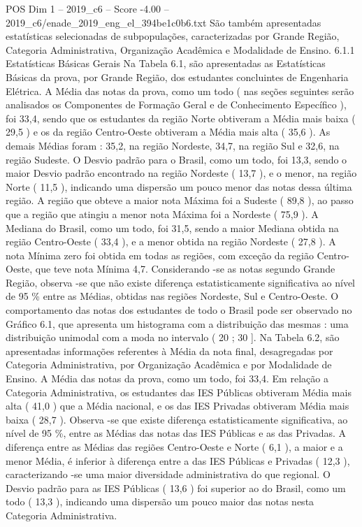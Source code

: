 \begin{textsample}{POS Dim 1 – 2019\_c6 – Score -4.00 – 2019\_c6/enade\_2019\_eng\_el\_394be1c0b6.txt}
São também apresentadas estatísticas selecionadas de subpopulações, caracterizadas por Grande Região, Categoria Administrativa, Organização Acadêmica e Modalidade de Ensino. 6.1.1 Estatísticas Básicas Gerais Na Tabela 6.1, são apresentadas as Estatísticas Básicas da prova, por Grande Região, dos estudantes concluintes de Engenharia Elétrica.
A Média das notas da prova, como um todo ( nas seções seguintes serão analisados os Componentes de Formação Geral e de Conhecimento Específico ), foi 33,4, sendo que os estudantes da região Norte obtiveram a Média mais baixa ( 29,5 ) e os da região Centro-Oeste obtiveram a Média mais alta ( 35,6 ).
As demais Médias foram : 35,2, na região Nordeste, 34,7, na região Sul e 32,6, na região Sudeste.
O Desvio padrão para o Brasil, como um todo, foi 13,3, sendo o maior Desvio padrão encontrado na região Nordeste ( 13,7 ), e o menor, na região Norte ( 11,5 ), indicando uma dispersão um pouco menor das notas dessa última região.
A região que obteve a maior nota Máxima foi a Sudeste ( 89,8 ), ao passo que a região que atingiu a menor nota Máxima foi a Nordeste ( 75,9 ).
A Mediana do Brasil, como um todo, foi 31,5, sendo a maior Mediana obtida na região Centro-Oeste ( 33,4 ), e a menor obtida na região Nordeste ( 27,8 ).
A nota Mínima zero foi obtida em todas as regiões, com exceção da região Centro-Oeste, que teve nota Mínima 4,7.
Considerando -se as notas segundo Grande Região, observa -se que não existe diferença estatisticamente significativa ao nível de 95 \% entre as Médias, obtidas nas regiões Nordeste, Sul e Centro-Oeste.
O comportamento das notas dos estudantes de todo o Brasil pode ser observado no Gráfico 6.1, que apresenta um histograma com a distribuição das mesmas : uma distribuição unimodal com a moda no intervalo ( 20 ; 30 ].
Na Tabela 6.2, são apresentadas informações referentes à Média da nota final, desagregadas por Categoria Administrativa, por Organização Acadêmica e por Modalidade de Ensino.
A Média das notas da prova, como um todo, foi 33,4.
Em relação a Categoria Administrativa, os estudantes das IES Públicas obtiveram Média mais alta ( 41,0 ) que a Média nacional, e os das IES Privadas obtiveram Média mais baixa ( 28,7 ).
Observa -se que existe diferença estatisticamente significativa, ao nível de 95 \%, entre as Médias das notas das IES Públicas e as das Privadas.
A diferença entre as Médias das regiões Centro-Oeste e Norte ( 6,1 ), a maior e a menor Média, é inferior à diferença entre a das IES Públicas e Privadas ( 12,3 ), caracterizando -se uma maior diversidade administrativa do que regional.
O Desvio padrão para as IES Públicas ( 13,6 ) foi superior ao do Brasil, como um todo ( 13,3 ), indicando uma dispersão um pouco maior das notas nesta Categoria Administrativa.

\end{textsample}
